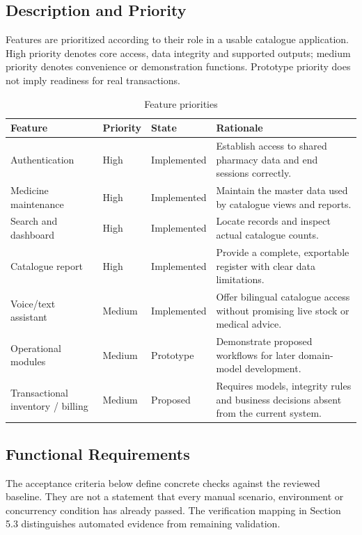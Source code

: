 \documentclass[11pt,a4paper]{article}
\begin{document}
\subsection{Description and Priority}
Features are prioritized according to their role in a usable catalogue application. High priority denotes core access, data integrity and supported outputs; medium priority denotes convenience or demonstration functions. Prototype priority does not imply readiness for real transactions.
\begin{table}[H]
\centering\small
\caption{Feature priorities}
\begin{tabularx}{\textwidth}{L{35mm}L{19mm}L{24mm}Y}
\toprule Feature & Priority & State & Rationale\\\midrule
Authentication & High & Implemented & Establish access to shared pharmacy data and end sessions correctly.\\
Medicine maintenance & High & Implemented & Maintain the master data used by catalogue views and reports.\\
Search and dashboard & High & Implemented & Locate records and inspect actual catalogue counts.\\
Catalogue report & High & Implemented & Provide a complete, exportable register with clear data limitations.\\
Voice/text assistant & Medium & Implemented & Offer bilingual catalogue access without promising live stock or medical advice.\\
Operational modules & Medium & Prototype & Demonstrate proposed workflows for later domain-model development.\\
Transactional inventory / billing & Medium & Proposed & Requires models, integrity rules and business decisions absent from the current system.\\
\bottomrule
\end{tabularx}
\end{table}

\subsection{Functional Requirements}
The acceptance criteria below define concrete checks against the reviewed baseline. They are not a statement that every manual scenario, environment or concurrency condition has already passed. The verification mapping in Section 5.3 distinguishes automated evidence from remaining validation.
\end{document}
